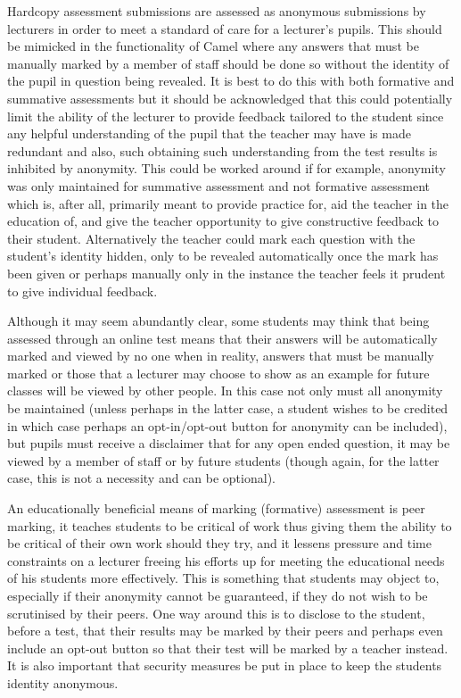     Hardcopy assessment submissions are assessed as anonymous submissions by lecturers in order to meet a standard of care for a lecturer’s pupils. This should be mimicked in the functionality of Camel where any answers that must be manually marked by a member of staff should be done so without the identity of the pupil in question being revealed. It is best to do this with both formative and summative assessments but it should be acknowledged that this could potentially limit the ability of the lecturer to provide feedback tailored to the student since any helpful understanding of the pupil that the teacher may have is made redundant and also, such obtaining such understanding from the test results is inhibited by anonymity. This could be worked around if for example, anonymity was only maintained for summative assessment and not formative assessment which is, after all, primarily meant to provide practice for, aid the teacher in the education of, and give the teacher opportunity to give constructive feedback to their student. Alternatively the teacher could mark each question with the student’s identity hidden, only to be revealed automatically once the mark has been given or perhaps manually only in the instance the teacher feels it prudent to give individual feedback.

    Although it may seem abundantly clear, some students may think that being assessed through an online test means that their answers will be automatically marked and viewed by no one when in reality, answers that must be manually marked or those that a lecturer may choose to show as an example for future classes will be viewed by other people. In this case not only must all anonymity be maintained (unless perhaps in the latter case, a student wishes to be credited in which case perhaps an opt-in/opt-out button for anonymity can be included), but pupils must receive a disclaimer that for any open ended question, it may be viewed by a member of staff or by future students (though again, for the latter case, this is not a necessity and can be optional).

    An educationally beneficial means of marking (formative) assessment is peer marking, it teaches students to be critical of work thus giving them the ability to be critical of their own work should they try, and it lessens pressure and time constraints on a lecturer freeing his efforts up for meeting the educational needs of his students more effectively. This is something that students may object to, especially if their anonymity cannot be guaranteed, if they do not wish to be scrutinised by their peers. One way around this is to disclose to the student, before a test, that their results may be marked by their peers and perhaps even include an opt-out button so that their test will be marked by a teacher instead. It is also important that security measures be put in place to keep the students identity anonymous.

